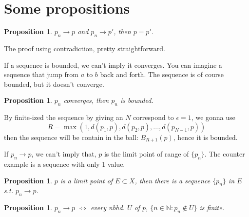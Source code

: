 \documentclass[12pt]{article}
\newcommand{\NN}{\mathbb{N}}   %
\theoremstyle{definition}
\theoremstyle{plain}
\newtheorem{proposition}[definition]{Proposition}
\begin{document}
\section{Some propositions}
\begin{proposition}
$p_n \rightarrow p$ and $p_n \rightarrow p'$, then $p=p'$.
\end{proposition}
\begin{note}
The proof using contradiction, pretty straightforward.
\end{note}
\begin{note}
If a sequence is bounded, we can't imply it converges. You can imagine a sequence that jump from $a$ to $b$ back and forth. The sequence is of course bounded, but it doesn't converge.
\end{note}

\begin{proposition}
$p_n$ converges, then $p_n$ is bounded.
\end{proposition}

\begin{note}
By finite-ized the sequence by giving an $N$ correspond to  $\epsilon = 1$, we gonna use 
$$R = \max(1, d(p_1, p), d(p_2, p),..., d(p_{N-1},p))$$
then the sequence will be contain in the ball: $B_{R+1}(p)$, hence it is bounded. 
\end{note}

\begin{note}
If $p_n \rightarrow p$, we can't imply that, $p$ is the limit point of range of $\{p_n\}$. The counter example is a sequence with only 1 value.
\end{note}

\begin{proposition}
$p$ is a limit point of $E \subset X$, then there is a sequence $\{p_n\}$ in $E$ s.t. $p_n \rightarrow p$.
\end{proposition}

\begin{proposition}
$p_n \rightarrow p$ $\iff$ every nbhd. $U$ of $p$, $\{n\in\NN: p_n \not\in U\}$ is finite.
\end{proposition}
\end{document}
